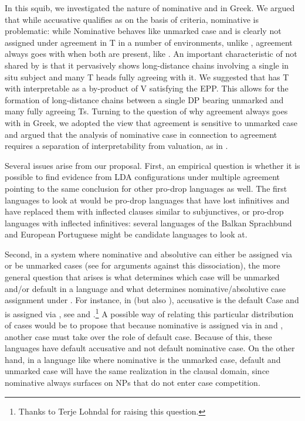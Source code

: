 \documentclass[output=paper]{langsci/langscibook}
\begin{document}
\begin{exe}
In this squib, we investigated the nature of nominative and
 in Greek. We argued that while accusative qualifies as
 on the basis of  criteria,
nominative is problematic: while  Nominative
behaves like unmarked case and is clearly not assigned under agreement in T in
a number of environments, unlike , agreement always goes with
\Nom{} when both are present, like . An important characteristic
of  not shared by  is that it pervasively shows
long-distance chains involving a single in situ \Nom{} subject and many T heads
fully agreeing with it. We suggested that  has T with interpretable
 as a by-product of V  satisfying the \gls{EPP}.
This allows for the formation of long-distance chains between a single DP
bearing unmarked \Nom{} and many fully agreeing Ts. Turning to the question of
why agreement always goes with \Nom{} in Greek, we adopted the view that
agreement is sensitive to unmarked case and argued that the analysis of
 nominative case in connection to agreement
requires a separation of interpretability from valuation, as in
\citet{PesetskyTorrego2007}.

Several issues arise from our proposal. First, an empirical question is whether
it is possible to find evidence from \gls{LDA} configurations under multiple
agreement pointing to the same conclusion for other pro-drop languages as well.
The first languages to look at would be pro-drop languages that have lost
infinitives and have replaced them with inflected clauses similar to 
subjunctives, or pro-drop languages with inflected infinitives: several
languages of the Balkan Sprachbund and European Portuguese might be candidate
languages to look at.

Second, in a system where nominative and absolutive can either be assigned via
 or be unmarked cases (see \citealt{LevPre2015} for arguments against this
dissociation), the more general question that arises is what determines which
case will be unmarked and/or default in a language and what determines
nominative/absolutive case assignment under . For instance, in 
(but also ), accusative is the default Case and \Nom{} is assigned via
, see \citet{Schutze2001} and \citet{McFadden2004}.\footnote{Thanks to Terje Lohndal
for raising this question.} A possible way of relating this particular
distribution of cases would be to propose that because nominative is assigned
via  in  and , another case must take over the role of
default case. Because of this, these languages have default accusative and not
default nominative case.  On the other hand, in a language like  where
nominative is the unmarked case, default and unmarked case will have the same
realization in the clausal domain, since nominative always surfaces on NPs that
do not enter case competition.


\end{exe}
\end{document}
